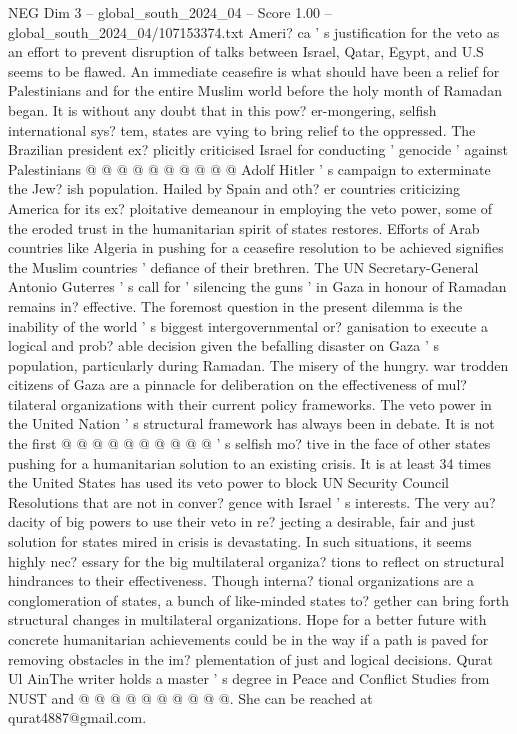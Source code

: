 \begin{textsample}{NEG Dim 3 – global\_south\_2024\_04 – Score 1.00 – global\_south\_2024\_04/107153374.txt}
Ameri? ca ' s justification for the veto as an effort to prevent disruption of talks between Israel, Qatar, Egypt, and U.S seems to be flawed.
An immediate ceasefire is what should have been a relief for Palestinians and for the entire Muslim world before the holy month of Ramadan began.
It is without any doubt that in this pow? er-mongering, selfish international sys? tem, states are vying to bring relief to the oppressed.
The Brazilian president ex? plicitly criticised Israel for conducting ' genocide ' against Palestinians @ @ @ @ @ @ @ @ @ @ Adolf Hitler ' s campaign to exterminate the Jew? ish population.
Hailed by Spain and oth? er countries criticizing America for its ex? ploitative demeanour in employing the veto power, some of the eroded trust in the humanitarian spirit of states restores.
Efforts of Arab countries like Algeria in pushing for a ceasefire resolution to be achieved signifies the Muslim countries ' defiance of their brethren.
The UN Secretary-General Antonio Guterres ' s call for ' silencing the guns ' in Gaza in honour of Ramadan remains in? effective.
The foremost question in the present dilemma is the inability of the world ' s biggest intergovernmental or? ganisation to execute a logical and prob? able decision given the befalling disaster on Gaza ' s population, particularly during Ramadan.
The misery of the hungry. war trodden citizens of Gaza are a pinnacle for deliberation on the effectiveness of mul? tilateral organizations with their current policy frameworks.
The veto power in the United Nation ' s structural framework has always been in debate.
It is not the first @ @ @ @ @ @ @ @ @ @ ' s selfish mo? tive in the face of other states pushing for a humanitarian solution to an existing crisis.
It is at least 34 times the United States has used its veto power to block UN Security Council Resolutions that are not in conver? gence with Israel ' s interests.
The very au? dacity of big powers to use their veto in re? jecting a desirable, fair and just solution for states mired in crisis is devastating.
In such situations, it seems highly nec? essary for the big multilateral organiza? tions to reflect on structural hindrances to their effectiveness.
Though interna? tional organizations are a conglomeration of states, a bunch of like-minded states to? gether can bring forth structural changes in multilateral organizations.
Hope for a better future with concrete humanitarian achievements could be in the way if a path is paved for removing obstacles in the im? plementation of just and logical decisions.
Qurat Ul AinThe writer holds a master ' s degree in Peace and Conflict Studies from NUST and @ @ @ @ @ @ @ @ @ @.
She can be reached at qurat4887@gmail.com.

\end{textsample}
